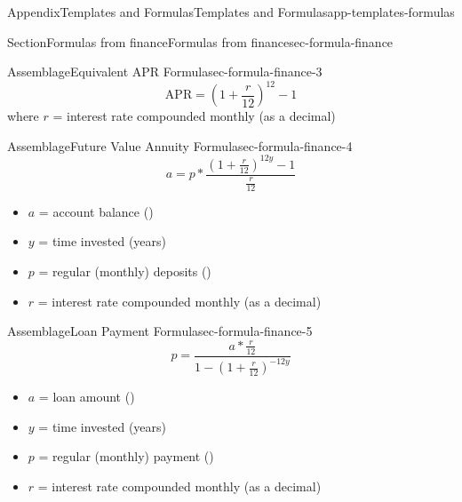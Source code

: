 \documentclass[twoside,11pt,]{book}
\numberwithin{equation}{section}
\providecommand\phantomsection{}
\begin{document}
\begin{appendixptx}{Appendix}{Templates and Formulas}{}{Templates and Formulas}{}{}{app-templates-formulas}
\begin{sectionptx}{Section}{Formulas from finance}{}{Formulas from finance}{}{}{sec-formula-finance}
\begin{assemblage}{Assemblage}{Equivalent APR Formula}{sec-formula-finance-3}
\begin{equation*}
\text{APR} = \left(1+\frac{r}{12}\right)^{12}-1
\end{equation*}
where \(r\) = interest rate compounded monthly (as a decimal)%
\end{assemblage}
\begin{assemblage}{Assemblage}{Future Value Annuity Formula}{sec-formula-finance-4}%
%
\begin{equation*}
a = p \ast \frac{\left( 1 + \frac{r}{12}\right) ^{12y}-1}{\frac{r}{12}}
\end{equation*}
%
\begin{itemize}[label=\textbullet]
\item{}\(a\) = account balance (\textdollar{})%
\item{}\(y\) = time invested (years)%
\item{}\(p\) = regular (monthly) deposits (\textdollar{})%
\item{}\(r\) = interest rate compounded monthly (as a decimal)%
\end{itemize}
%
\end{assemblage}
\begin{assemblage}{Assemblage}{Loan Payment Formula}{sec-formula-finance-5}%
%
\begin{equation*}
p = \frac{a  \ast \frac{r}{12}}{1-\left( 1 + \frac{r}{12}\right) ^{-12y}}
\end{equation*}
%
\begin{itemize}[label=\textbullet]
\item{}\(a\) = loan amount (\textdollar{})%
\item{}\(y\) = time invested (years)%
\item{}\(p\) = regular (monthly) payment (\textdollar{})%
\item{}\(r\) = interest rate compounded monthly (as a decimal)%
\end{itemize}
%
\end{assemblage}
\end{sectionptx}
\end{appendixptx}
%
\backmatter%
%
\clearpage\phantomsection%
%
\end{document}
